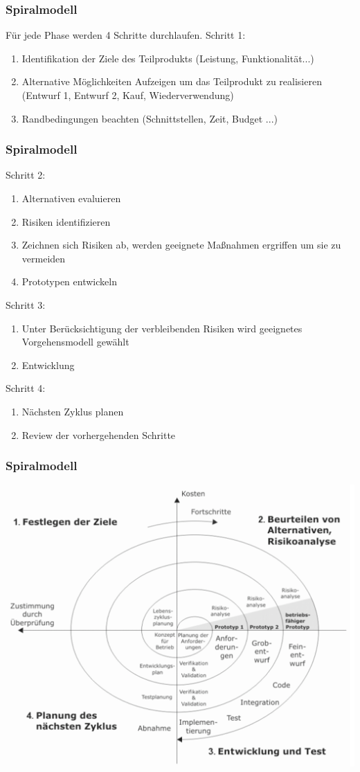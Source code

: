 \begin{frame}
\frametitle{Spiralmodell}
	Für jede Phase werden 4 Schritte durchlaufen.
	\newline\newline
	Schritt 1:
	\begin{enumerate}
		\item Identifikation der Ziele des Teilprodukts (Leistung, Funktionalität...)
		\item Alternative Möglichkeiten Aufzeigen um das Teilprodukt zu realisieren
		(Entwurf 1, Entwurf 2, Kauf, Wiederverwendung)
		\item Randbedingungen beachten (Schnittstellen, Zeit, Budget ...)
	\end{enumerate}
\end{frame}

\begin{frame}
\frametitle{Spiralmodell}
	Schritt 2:
	\begin{enumerate}
		\item Alternativen evaluieren
		\item Risiken identifizieren
		\item Zeichnen sich Risiken ab, werden geeignete Maßnahmen ergriffen
		um sie zu vermeiden
		\item Prototypen entwickeln
	\end{enumerate}
	\bigskip
	Schritt 3:
	\begin{enumerate}
		\item Unter Berücksichtigung der verbleibenden Risiken wird geeignetes
		Vorgehensmodell gewählt
		\item Entwicklung
	\end{enumerate}
	\bigskip
	Schritt 4:
	\begin{enumerate}
		\item Nächsten Zyklus planen
		\item Review der vorhergehenden Schritte
	\end{enumerate}
\end{frame}

\begin{frame}
\frametitle{Spiralmodell}
	\center\includegraphics[width=1\textwidth,
			keepaspectratio=true]{bilder/spiralmodell.png}
\end{frame}

